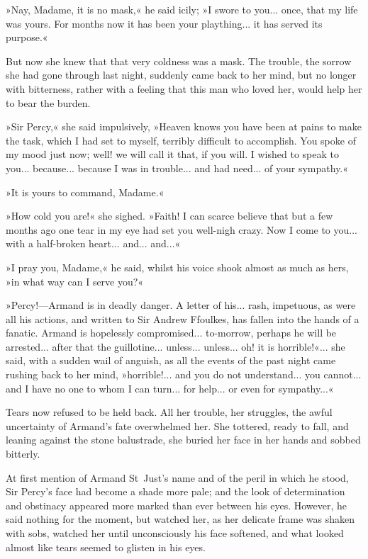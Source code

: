 »Nay, Madame, it is no mask,« he said icily; »I swore to you... once, that my life was yours. For months now it has been your plaything... it has served its purpose.«

But now she knew that that very coldness was a mask. The trouble, the sorrow she had gone through last night, suddenly came back to her mind, but no longer with bitterness, rather with a feeling that this man who loved her, would help her to bear the burden.

»Sir Percy,« she said impulsively, »Heaven knows you have been at pains to make the task, which I had set to myself, terribly difficult to accomplish. You spoke of my mood just now; well! we will call it that, if you will. I wished to speak to you... because... because I was in trouble... and had need... of your sympathy.«

»It is yours to command, Madame.«

»How cold you are!« she sighed. »Faith! I can scarce believe that but a few months ago one tear in my eye had set you well-nigh crazy. Now I come to you... with a half-broken heart... and... and...«

»I pray you, Madame,« he said, whilst his voice shook almost as much as hers, »in what way can I serve you?«

»Percy!\allowbreak---\allowbreak Armand is in deadly danger. A letter of his... rash, impetuous, as were all his actions, and written to Sir Andrew Ffoulkes, has fallen into the hands of a fanatic. Armand is hopelessly compromised... to-morrow, perhaps he will be arrested... after that the guillotine... unless... unless... oh! it is horrible!«... she said, with a sudden wail of anguish, as all the events of the past night came rushing back to her mind, »horrible!... and you do not understand... you cannot... and I have no one to whom I can turn... for help... or even for sympathy...«

Tears now refused to be held back. All her trouble, her struggles, the awful uncertainty of Armand's fate overwhelmed her. She tottered, ready to fall, and leaning against the stone balustrade, she buried her face in her hands and sobbed bitterly.

At first mention of Armand St~Just's name and of the peril in which he stood, Sir Percy's face had become a shade more pale; and the look of determination and obstinacy appeared more marked than ever between his eyes. However, he said nothing for the moment, but watched her, as her delicate frame was shaken with sobs, watched her until unconsciously his face softened, and what looked almost like tears seemed to glisten in his eyes.

